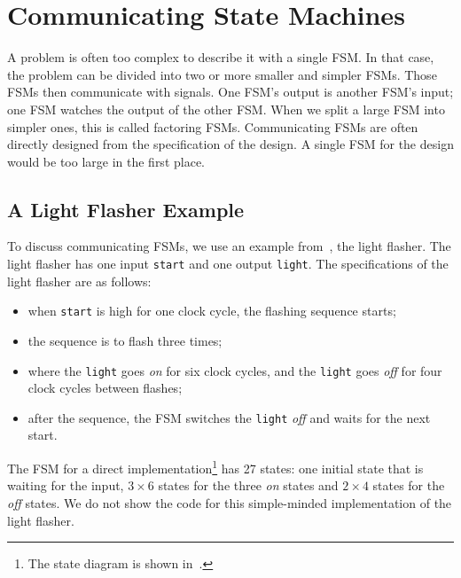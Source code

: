 \documentclass[%
    10pt,
    headinclude, footexclude,
    openright, %
    notitlepage,
    cleardoubleempty,
    headsepline,
    pointlessnumbers,
    bibtotoc, idxtotoc,
    ]{scrbook}
\newcommand{\code}[1]{{\lstinline[basicstyle=\small\ttfamily]{#1}}}
\newcommand{\todo}[1]{{\emph{TODO: #1}}}
\renewcommand{\todo}[1]{}
\begin{document}
\todo{Luca: Greatest common divisor with Euclide algorithm can be also a nice exercise.
Martin: but this is shown at the Chisel homepage without an FSM.}

\todo{Here a more interesting exercise. And not one from Dally.}

\chapter{Communicating State Machines}

A problem is often too complex to describe it with a single FSM.
In that case, the problem can be divided into two or more smaller and simpler FSMs.
Those FSMs then communicate with signals. One FSM's output is
another FSM's input; one FSM watches the output of the other FSM.
When we split a large FSM into simpler ones, this is called factoring FSMs.
Communicating FSMs are often directly designed from the specification
of the design. A single FSM for the design would be too large in the first place.

\section{A Light Flasher Example}

To discuss communicating FSMs, we use an example
from~\cite[Chapter~17]{dally:vhdl:2016}, the light flasher.
The light flasher has one input \code{start} and one output
\code{light}. The specifications of the light flasher are as follows:
\begin{itemize}
\item when \code{start} is high for one clock cycle, the flashing
sequence starts;
\item the sequence is to flash three times;
\item where the \code{light} goes \emph{on} for six clock cycles, and the \code{light} goes \emph{off} for four clock cycles between flashes;
\item after the sequence, the FSM switches the \code{light} \emph{off} and waits
for the next start.
\end{itemize}

The FSM for a direct implementation\footnote{The state diagram is shown
in~\cite[p.~376]{dally:vhdl:2016}.} has 27 states:
one initial state that is waiting for the input, $3 \times 6$ states for the three
\emph{on} states and $2 \times 4$ states for the \emph{off} states.
We do not show the code for this simple-minded implementation of the light
flasher.
\end{document}
